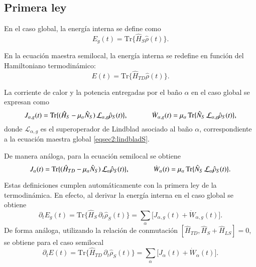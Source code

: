 \subsection*{Primera ley}

En el caso global, la energía interna se define como
\begin{equation*}
    E_{g}(t) = \text{Tr}\{\hat{H}_{S}\hat{\rho}(t)\}.
\end{equation*}

En la ecuación maestra semilocal, la energía interna se redefine en función del Hamiltoniano termodinámico:
\begin{equation}
    E(t) = \text{Tr}\{\hat{H}_{TD}\hat{\rho}(t)\}.
    \label{sec2:energyeq}
\end{equation}

La corriente de calor y la potencia entregadas por el baño $\alpha$ en el caso global se expresan como
\begin{equation*}
    J_{\alpha,g}(t) = \text{Tr}\{(\hat{H}_{S} - \mu_{\alpha}\hat{N}_S)\,\mathcal{L}_{\alpha,g}\hat{\rho}_{S}(t)\}, 
    \hspace{12mm} 
    \dot{W}_{\alpha,g}(t) = \mu_{\alpha}\,\text{Tr}\{\hat{N}_{S}\,\mathcal{L}_{\alpha,g}\hat{\rho}_{S}(t)\},
\end{equation*}
donde $\mathcal{L}_{\alpha,g}$ es el superoperador de Lindblad asociado al baño $\alpha$, correspondiente a la ecuación maestra global \ref{eqsec2:lindbladS}.

De manera análoga, para la ecuación semilocal se obtiene
\begin{equation}
    J_{\alpha}(t) = \text{Tr}\{(\hat{H}_{TD} - \mu_{\alpha}\hat{N}_S)\,\mathcal{L}_{\alpha}\hat{\rho}_{S}(t)\}, 
    \hspace{12mm} 
    \dot{W}_{\alpha}(t) = \mu_{\alpha}\,\text{Tr}\{\hat{N}_{S}\,\mathcal{L}_{\alpha}\hat{\rho}_{S}(t)\}.
    \label{sec2:heatworkeq}
\end{equation}

Estas definiciones cumplen automáticamente con la primera ley de la termodinámica. 
En efecto, al derivar la energía interna en el caso global se obtiene
\begin{equation*}
    \partial_{t}E_{g}(t) = \text{Tr}\{\hat{H}_{S}\,\partial_{t}\hat{\rho}_{S}(t)\} 
    = \sum_{\alpha}\big[J_{\alpha,g}(t) + \dot{W}_{\alpha,g}(t)\big].
\end{equation*}
De forma análoga, utilizando la relación de conmutación $[\hat{H}_{TD},\hat{H}_{S}+\hat{H}_{LS}] = 0$, 
se obtiene para el caso semilocal
\begin{equation*}
    \partial_{t}E(t) = \text{Tr}\{\hat{H}_{TD}\,\partial_{t}\hat{\rho}_{S}(t)\} 
    = \sum_{\alpha}\big[J_{\alpha}(t) + \dot{W}_{\alpha}(t)\big].
\end{equation*}

